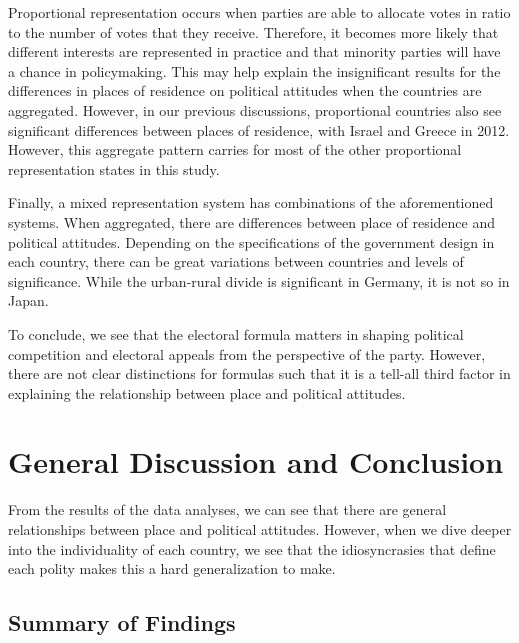 \documentclass[12pt, titlepage]{article}
\begin{document}
Proportional representation occurs when parties are able to allocate votes in ratio to the number of votes that they receive. Therefore, it becomes more likely that different interests are represented in practice and that minority parties will have a chance in policymaking. This may help explain the insignificant results for the differences in places of residence on political attitudes when the countries are aggregated. However, in our previous discussions, proportional countries also see significant differences between places of residence, with Israel and Greece in 2012. However, this aggregate pattern carries for most of the other proportional representation states in this study.

Finally, a mixed representation system has combinations of the aforementioned systems. When aggregated, there are differences between place of residence and political attitudes. Depending on the specifications of the government design in each country, there can be great variations between countries and levels of significance. While the urban-rural divide is significant in Germany, it is not so in Japan. 

To conclude, we see that the electoral formula matters in shaping political competition and electoral appeals from the perspective of the party. However, there are not clear distinctions for formulas such that it is a tell-all third factor in explaining the relationship between place and political attitudes. 

\section{General Discussion and Conclusion}

From the results of the data analyses, we can see that there are general relationships between place and political attitudes. However, when we dive deeper into the individuality of each country, we see that the idiosyncrasies that define each polity makes this a hard generalization to make. 

\subsection{Summary of Findings}
\end{document}
